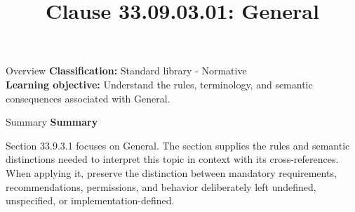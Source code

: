 \documentclass[10pt,letterpaper]{article}
\title{Clause 33.09.03.01: General}
\author{}
\date{}
\begin{document}
\maketitle
\begin{CornellOverviewBox}{Overview}
\textbf{Classification:} Standard library - Normative\\[2pt]
\textbf{Learning objective:} Understand the rules, terminology, and semantic consequences associated with General.
\end{CornellOverviewBox}\begin{CornellSummaryBox}{Summary}
{\sffamily\bfseries\color{Accent} Summary}\par\vspace{3pt}Section 33.9.3.1 focuses on General. The section supplies the rules and semantic distinctions needed to interpret this topic in context with its cross-references. When applying it, preserve the distinction between mandatory requirements, recommendations, permissions, and behavior deliberately left undefined, unspecified, or implementation-defined.
\end{CornellSummaryBox}
\end{document}
